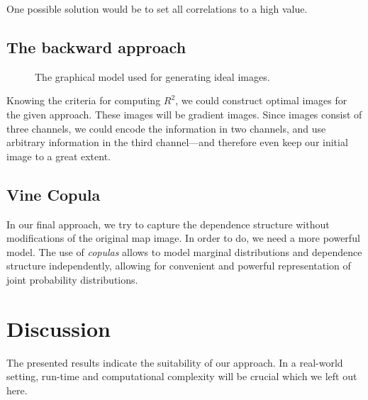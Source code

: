 \documentclass{article}
\begin{document}

One possible solution would be to set all correlations to a high
value.

\subsection{The backward approach}

\begin{figure}[h]
  \centering
  \caption{The graphical model used for generating ideal images.}
\end{figure}

Knowing the criteria for computing $R^2$, we could construct optimal
images for the given approach. These images will be gradient
images. Since images consist of three channels, we could encode the
information in two channels, and use arbitrary information in the
third channel---and therefore even keep our initial image to a great
extent.

\subsection{Vine Copula}

In our final approach, we try to capture the dependence structure
without modifications of the original map image. In order to do, we
need a more powerful model. The use of \emph{copulas} allows to model
marginal distributions and dependence structure independently,
allowing for convenient and powerful representation of joint
probability distributions.
                                          
\section{Discussion}

The presented results indicate the suitability of our approach. In a
real-world setting, run-time and computational complexity will be
crucial which we left out here.
\end{document}
